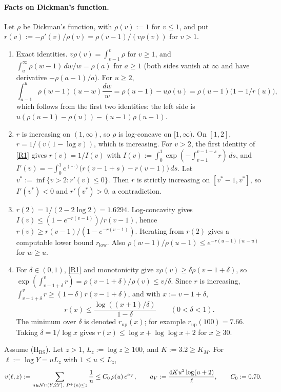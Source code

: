 \paragraph{Facts on Dickman's function.} Let $\rho$ be Dickman's function, with $\rho(v):=1$ for $v\le1$, and put
$r(v):=-\rho'(v)/\rho(v)=\rho(v-1)/(v\rho(v))$ for $v>1$.
\begin{enumerate}[label=(R\arabic*)]
\item\label{R1} Exact identities. $v\rho(v)=\int_{v-1}^v\rho$ for $v\ge1$, and $\int_a^\infty\rho(w-1)\,dw/w=\rho(a)$
  for $a\ge1$ (both sides vanish at $\infty$ and have derivative $-\rho(a-1)/a$). For $u\ge2$,
  \[
    \int_{u-1}^u\rho(w-1)(u-w)\frac{dw}{w}=\rho(u-1)-u\rho(u)=\rho(u-1)\big(1-1/r(u)\big),
  \]
  which follows from the first two identities: the left side is $u(\rho(u-1)-\rho(u))-(u-1)\rho(u-1)$.
\item\label{R2} $r$ is increasing on $(1,\infty)$, so $\rho$ is log-concave on $[1,\infty)$. On $[1,2]$,
  $r=1/(v(1-\log v))$, which is increasing. For $v>2$, the first identity of \ref{R1} gives $r(v)=1/I(v)$ with
  $I(v):=\int_0^1\exp(-\int_{v-1}^{v-1+s}r)\,ds$, and
  $I'(v)=-\int_0^1e^{(\cdots)}\big(r(v-1+s)-r(v-1)\big)\,ds$. Let $v^*:=\inf\{v>2:r'(v)\le0\}$. Then $r$ is strictly
  increasing on $[v^*-1,v^*]$, so $I'(v^*)<0$ and $r'(v^*)>0$, a contradiction.
\item\label{R3} $r(2)=1/(2-2\log2)=1.6294$. Log-concavity gives $I(v)\le(1-e^{-r(v-1)})/r(v-1)$, hence
  $r(v)\ge r(v-1)/(1-e^{-r(v-1)})$. Iterating from $r(2)$ gives a computable lower bound $r_{\mathrm{low}}$. Also
  $\rho(w-1)/\rho(u-1)\le e^{-r(u-1)(w-u)}$ for $w\ge u$.
\item\label{R4} For $\delta\in(0,1)$, \ref{R1} and monotonicity give $v\rho(v)\ge\delta\rho(v-1+\delta)$, so
  $\exp(\int_{v-1+\delta}^vr)=\rho(v-1+\delta)/\rho(v)\le v/\delta$. Since $r$ is increasing,
  $\int_{v-1+\delta}^vr\ge(1-\delta)r(v-1+\delta)$, and with $x:=v-1+\delta$,
  \[
    r(x)\le\frac{\log((x+1)/\delta)}{1-\delta}\qquad(0<\delta<1).
  \]
  The minimum over $\delta$ is denoted $r_{\mathrm{up}}(x)$; for example $r_{\mathrm{up}}(100)=7.66$. Taking
  $\delta=1/\log x$ gives $r(x)\le\log x+\log\log x+2$ for $x\ge30$.
\end{enumerate}

\begin{lemma}\label{lem:smooth-v}
Assume \textup{(H$_{\mathrm{BS}}$)}. Let $z>1$, $L_z:=\log z\ge100$, and $K:=3.2\ge K_M$. For $\ell:=\log Y=uL_z$ with
$1\le u\le L_z$,
\[
  v(\ell,z):=\sum_{n\in\NN\cap(Y,2Y],\ \Pplus(n)\le z}\frac1n\le C_0\,\rho(u)\,e^{a_V},\qquad
  a_V:=\frac{4Ku^2\log(u+2)}{\ell},\qquad C_0:=0.70.
\]
\end{lemma}

